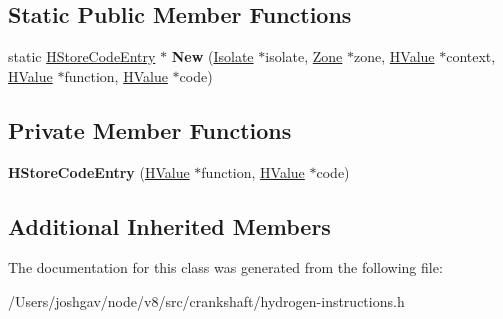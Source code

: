 \subsection*{Static Public Member Functions}
\begin{DoxyCompactItemize}
\item 
static \hyperlink{classv8_1_1internal_1_1_h_store_code_entry}{H\+Store\+Code\+Entry} $\ast$ {\bfseries New} (\hyperlink{classv8_1_1internal_1_1_isolate}{Isolate} $\ast$isolate, \hyperlink{classv8_1_1internal_1_1_zone}{Zone} $\ast$zone, \hyperlink{classv8_1_1internal_1_1_h_value}{H\+Value} $\ast$context, \hyperlink{classv8_1_1internal_1_1_h_value}{H\+Value} $\ast$function, \hyperlink{classv8_1_1internal_1_1_h_value}{H\+Value} $\ast$code)\hypertarget{classv8_1_1internal_1_1_h_store_code_entry_af8ae1318d9d6be506d0e53ad7f619831}{}\label{classv8_1_1internal_1_1_h_store_code_entry_af8ae1318d9d6be506d0e53ad7f619831}

\end{DoxyCompactItemize}
\subsection*{Private Member Functions}
\begin{DoxyCompactItemize}
\item 
{\bfseries H\+Store\+Code\+Entry} (\hyperlink{classv8_1_1internal_1_1_h_value}{H\+Value} $\ast$function, \hyperlink{classv8_1_1internal_1_1_h_value}{H\+Value} $\ast$code)\hypertarget{classv8_1_1internal_1_1_h_store_code_entry_af5dc8d4de7f69cc0a6a18348cdebf429}{}\label{classv8_1_1internal_1_1_h_store_code_entry_af5dc8d4de7f69cc0a6a18348cdebf429}

\end{DoxyCompactItemize}
\subsection*{Additional Inherited Members}


The documentation for this class was generated from the following file\+:\begin{DoxyCompactItemize}
\item 
/\+Users/joshgav/node/v8/src/crankshaft/hydrogen-\/instructions.\+h\end{DoxyCompactItemize}
